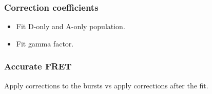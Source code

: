 \subsubsection{Correction coefficients}

\begin{itemize}
\item Fit D-only and A-only population.
\item Fit gamma factor.
\end{itemize}


\subsubsection{Accurate FRET}

Apply corrections to the bursts vs apply corrections after the fit.


